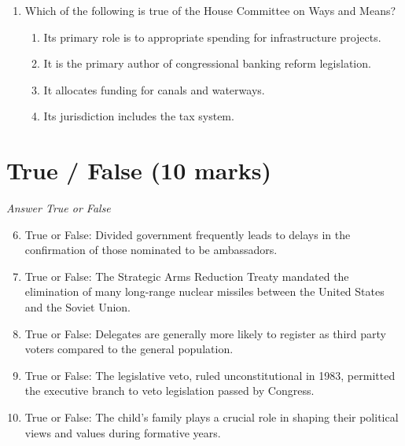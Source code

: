 \documentclass[12pt]{article}
\begin{document}
\begin{enumerate}[label=\arabic*.]
\begin{enumerate}[label=(\alph*)]
    \item Framers' unqualified commitment to individual rights
    \item small states' determination to receive equal representation in the legislature
    \item Northern states' support for abolitionism
    \item states' fears of an overpowerful national government
\end{enumerate}
\item Which of the following is true of the House Committee on Ways and Means?
\begin{enumerate}[label=(\alph*)]
    \item Its primary role is to appropriate spending for infrastructure projects.
    \item It is the primary author of congressional banking reform legislation.
    \item It allocates funding for canals and waterways.
    \item Its jurisdiction includes the tax system.
\end{enumerate}
\end{enumerate}

\section*{True / False (10 marks)}
\textit{Answer True or False}
\begin{enumerate}[label=\arabic*.]
\setcounter{enumi}{5}
\item True or False: Divided government frequently leads to delays in the confirmation of those nominated to be ambassadors.
\item True or False: The Strategic Arms Reduction Treaty mandated the elimination of many long-range nuclear missiles between the United States and the Soviet Union.
\item True or False: Delegates are generally more likely to register as third party voters compared to the general population.
\item True or False: The legislative veto, ruled unconstitutional in 1983, permitted the executive branch to veto legislation passed by Congress.
\item True or False: The child's family plays a crucial role in shaping their political views and values during formative years.
\end{enumerate}
\end{document}
